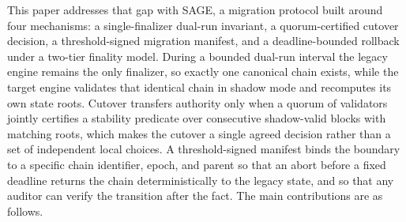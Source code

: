 \documentclass[journal]{IEEEtran}
\begin{document}
This paper addresses that gap with SAGE, a migration protocol built around four
mechanisms: a single-finalizer dual-run invariant, a quorum-certified cutover decision, a
threshold-signed migration manifest, and a deadline-bounded rollback under a two-tier
finality model. During a bounded dual-run interval the legacy engine remains the only
finalizer, so exactly one canonical chain exists, while the target engine validates that
identical chain in shadow mode and recomputes its own state roots. Cutover transfers
authority only when a quorum of validators jointly certifies a stability predicate over
consecutive shadow-valid blocks with matching roots, which makes the cutover a single
agreed decision rather than a set of independent local choices. A threshold-signed manifest
binds the boundary to a specific chain identifier, epoch, and parent so that an abort before
a fixed deadline returns the chain deterministically to the legacy state, and so that any
auditor can verify the transition after the fact. The main contributions are as follows.
\end{document}
